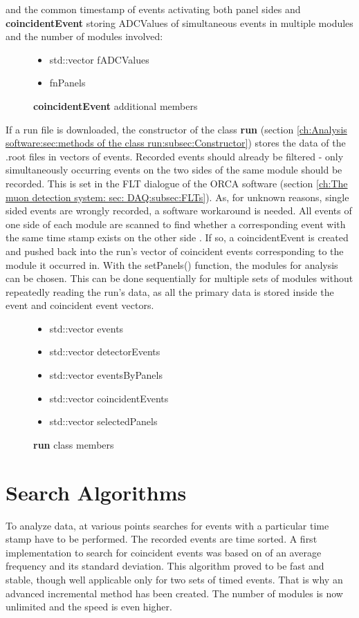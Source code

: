     and the common timestamp of events activating both panel sides and
    {\bf coincidentEvent} storing ADCValues of simultaneous events in multiple modules and the number of modules involved:
    \begin{figure}[H]
      \caption*{{\bf coincidentEvent} additional members}
	\begin{itemize}
	  \item std::vector fADCValues
	  \item fnPanels
      \end{itemize}
    \end{figure}
    If a run file is downloaded, the constructor of the class {\bf run} (section \ref{ch:Analysis software:sec:methods of the class run:subsec:Constructor}) stores the data of the .root files in vectors of events.
    Recorded events should already be filtered - only simultaneously occurring events on the two sides of the same module should be recorded. This is set in the FLT dialogue of the ORCA software (section \ref{ch:The muon detection system: sec: DAQ:subsec:FLTs}). As, for unknown reasons, single sided events are wrongly recorded, a software workaround is needed. All events of one side of each module are scanned to find whether a corresponding event with the same time stamp exists on the other side . If so, a coincidentEvent is created and pushed back into the run's vector of coincident events corresponding to the module it occurred in.
    With the setPanels() function, the modules for analysis can be chosen. This can be done sequentially for multiple sets of modules without repeatedly reading the run's data, as all the primary data is stored inside the event and coincident event vectors.
    \begin{figure}[h]
      \caption*{{\bf run} class members}
	\begin{itemize}
	  \item std::vector events
	  \item std::vector detectorEvents
	  \item std::vector eventsByPanels
	  \item std::vector coincidentEvents
	  \item std::vector selectedPanels
      \end{itemize}
    \end{figure}
    
    
  
  \section{Search Algorithms}
  \label{ch:Analysis software:sec:Search algorithms}
    To analyze data, at various points searches for events with a particular time stamp have to be performed. The recorded events are time sorted. A first implementation to search for coincident events was based on of an average frequency and its standard deviation. This algorithm proved to be fast and stable, though well applicable only for two sets of timed events. That is why an advanced incremental method has been created. The number of modules is now unlimited and the speed is even higher.
